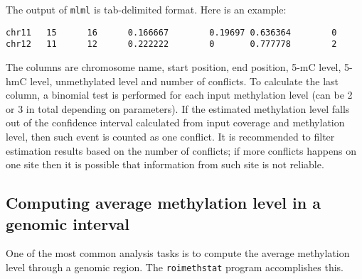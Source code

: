 \documentclass[10pt]{article}
\newcommand{\prog}[1]{\texttt{#1}}
\begin{document}
{{The output of \prog{mlml} is tab-delimited format. Here is an example:
\begin{verbatim}
chr11   15      16      0.166667        0.19697 0.636364        0
chr12   11      12      0.222222        0       0.777778        2
\end{verbatim}
The columns are chromosome name, start position, end position, 5-mC level,
5-hmC level, unmethylated level and number of conflicts. To calculate the last
column, a binomial test is performed for each input methylation level
(can be 2 or 3 in total depending on parameters). If the estimated
methylation level falls out of the confidence interval calculated from
input coverage and methylation level, then such event is counted as one
conflict. It is recommended to filter estimation results based on the number
of conflicts; if more conflicts happens on one site then it is possible
that information from such site is not reliable.

\subsection{Computing average methylation level in a genomic interval}
\label{sec:roimethstat}

One of the most common analysis tasks is to compute the average
methylation level through a genomic region. The \prog{roimethstat}
program accomplishes this.

}}
\end{document}
